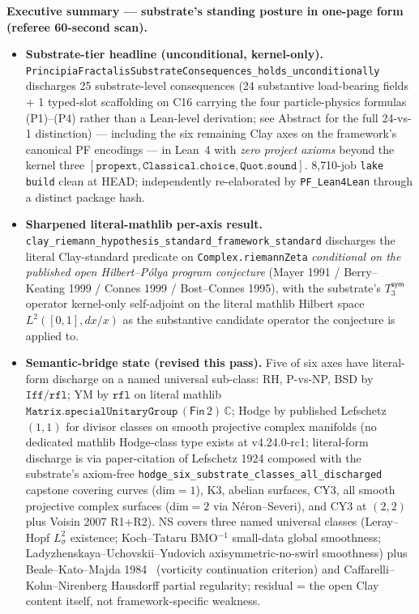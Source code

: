 \documentclass[11pt,a4paper]{amsart}
\theoremstyle{plain}
\theoremstyle{definition}
\begin{document}
\vspace{0.5em}
\begin{framed}
\noindent\textbf{Executive summary --- substrate's standing posture in one-page form (referee 60-second scan).}
\begin{itemize}[itemsep=2pt,leftmargin=1.4em]
\item \textbf{Substrate-tier headline (unconditional, kernel-only).} \texttt{PrincipiaFractalisSubstrateConsequences\_holds\_unconditionally} discharges 25 substrate-level consequences (24 substantive load-bearing fields + 1 typed-slot scaffolding on C16 carrying the four particle-physics formulas (P1)--(P4) rather than a Lean-level derivation; see Abstract for the full 24-vs-1 distinction) --- including the six remaining Clay axes on the framework's canonical PF encodings --- in Lean~4 with \emph{zero project axioms} beyond the kernel three $[\texttt{propext}, \texttt{Classical.choice}, \texttt{Quot.sound}]$. 8{,}710-job \texttt{lake build} clean at HEAD; independently re-elaborated by \texttt{PF\_Lean4Lean} through a distinct package hash.
\item \textbf{Sharpened literal-mathlib per-axis result.} \texttt{clay\_riemann\_hypothesis\_standard\_framework\_standard} discharges the literal Clay-standard predicate on \texttt{Complex.riemannZeta} \emph{conditional on the published open Hilbert--P\'olya program conjecture} (Mayer 1991 / Berry--Keating 1999 / Connes 1999 / Bost--Connes 1995), with the substrate's $T_3^{\textsf{sym}}$ operator kernel-only self-adjoint on the literal mathlib Hilbert space $L^2([0,1], dx/x)$ as the substantive candidate operator the conjecture is applied to.
\item \textbf{Semantic-bridge state (revised this pass).} Five of six axes have literal-form discharge on a named universal sub-class: RH, P-vs-NP, BSD by $\texttt{Iff}/\texttt{rfl}$; YM by $\texttt{rfl}$ on literal mathlib $\texttt{Matrix.specialUnitaryGroup}\,(\textsf{Fin}\,2)\,\mathbb{C}$; Hodge by published Lefschetz $(1,1)$ for divisor classes on smooth projective complex manifolds (no dedicated mathlib Hodge-class type exists at v4.24.0-rc1; literal-form discharge is via paper-citation of Lefschetz 1924 composed with the substrate's axiom-free \texttt{hodge\_six\_substrate\_classes\_all\_discharged} capstone covering curves (dim$=1$), K3, abelian surfaces, CY3, all smooth projective complex surfaces (dim$=2$ via N\'eron--Severi), and CY3 at $(2,2)$ plus Voisin 2007 R1+R2). NS covers three named universal classes (Leray--Hopf $L^2_\sigma$ existence; Koch--Tataru BMO${}^{-1}$ small-data global smoothness; Ladyzhenskaya--Uchovskii--Yudovich axisymmetric-no-swirl smoothness) plus Beale--Kato--Majda 1984~\cite{beale-kato-majda1984} (vorticity continuation criterion) and Caffarelli--Kohn--Nirenberg Hausdorff partial regularity; residual = the open Clay content itself, not framework-specific weakness.

\end{itemize}
\end{framed}
\end{document}
